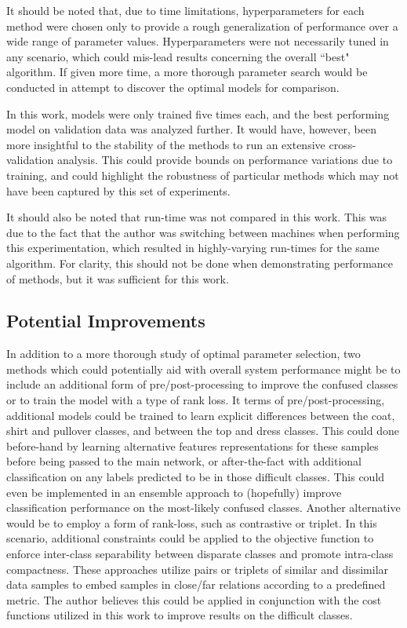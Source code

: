 \documentclass[conference]{IEEEtran}
\begin{document}
It should be noted that, due to time limitations, hyperparameters for each method were chosen only to provide a rough generalization of performance over a wide range of parameter values.  Hyperparameters were not necessarily tuned in any scenario, which could mis-lead results concerning the overall ``best" algorithm.  If given more time, a more thorough parameter search would be conducted in attempt to discover the optimal models for comparison.

In this work, models were only trained five times each, and the best performing model on validation data was analyzed further.  It would have, however, been more insightful to the stability of the methods to run an extensive cross-validation analysis.  This could provide bounds on performance variations due to training, and could highlight the robustness of particular methods which may not have been captured by this set of experiments.

It should also be noted that run-time was not compared in this work.  This was due to the fact that the author was switching between machines when performing this experimentation, which resulted in highly-varying run-times for the same algorithm.  For clarity, this should not be done when demonstrating performance of methods, but it was sufficient for this work. 

\subsection{Potential Improvements}
In addition to a more thorough study of optimal parameter selection, two methods which could potentially aid with overall system performance might be to include an additional form of pre/post-processing to improve the confused classes or to train the model with a type of rank loss.  It terms of pre/post-processing, additional models could be trained to learn explicit differences between the coat, shirt and  pullover classes, and between the top and dress classes.  This could done before-hand by learning alternative  features representations for these samples before being passed to the main network, or after-the-fact with additional classification on any labels predicted to be in those difficult classes.  This could even be implemented in an ensemble approach to (hopefully) improve classification performance on the most-likely confused classes.  Another alternative  would be to employ a form of rank-loss, such as contrastive or triplet.  In this scenario, additional constraints could be applied to the objective function to enforce inter-class separability between disparate classes and promote intra-class compactness.  These approaches utilize pairs or triplets of similar and  dissimilar data samples to embed samples  in close/far relations according to a predefined metric.  The author believes this could be applied  in conjunction with the cost functions utilized in this work to improve results on the difficult classes.
\end{document}
